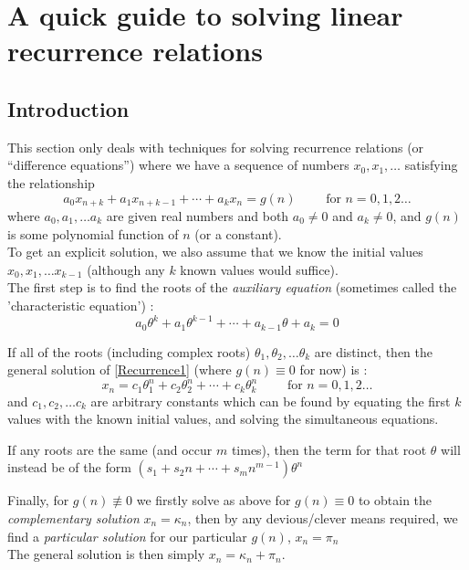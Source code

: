 \section{A quick guide to solving linear recurrence relations}
\subsection{Introduction}

This section only deals with techniques for solving recurrence relations (or ``difference equations'') where we have a sequence of numbers 
$x_0, x_1, \ldots$ satisfying the relationship
\begin{equation}  
a_0x_{n+k} + a_1x_{n+k-1} + \cdots + a_kx_n = g(n) \qquad \text{ for } n = 0, 1, 2 \ldots
\tag{R1} \label{Recurrence1}
\end{equation}
where $a_0, a_1, \ldots a_k$ are given real numbers and both $a_0 \neq 0$ and $a_k \neq 0$, and $g(n)$ is some polynomial function of $n$ (or a constant).
\\
To get an explicit solution, we also assume that we know the initial values $x_0, x_1, \ldots x_{k-1}$ (although any $k$ known values would suffice). 
\\
The first step is to find the roots of the \emph{auxiliary equation} (sometimes called the 'characteristic equation') :  
\begin{equation} 
a_0\theta^{k} + a_1\theta^{k-1} + \cdots + a_{k-1}\theta + a_k = 0
\end{equation}

If all of the roots (including complex roots) $\theta_1, \theta_2, \ldots \theta_k$ are distinct, then the general solution of  \eqref{Recurrence1} (where $g(n) \equiv 0$ for now) is :
\begin{equation} 
x_n = c_1\theta_1^{n} + c_2\theta_2^{n} + \cdots + c_k\theta_k^{n} \qquad \text{ for } n = 0, 1, 2 \ldots
\end{equation}
and $c_1, c_2, \ldots c_k$ are arbitrary constants which can be found by equating the first $k$ values with the known initial values, and solving the simultaneous equations.
  
If any roots are the same (and occur $m$ times), then the term for that root $\theta$ will instead be of the form 
$(s_1 + s_2n + \cdots + s_mn^{m-1})\theta^n$

Finally, for $g(n) \not\equiv 0$  we firstly solve as above for $g(n) \equiv 0$ to obtain the \emph{complementary solution} $x_n = \kappa_n$, then by any devious/clever means required, 
we find a \emph{particular solution} for our particular $g(n)$, $x_n = \pi_n$
\\
The general solution is then simply $x_n = \kappa_n + \pi_n$.

